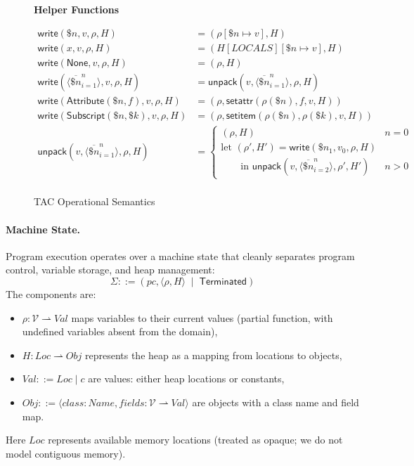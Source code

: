 \begin{figure*}[p]


\vspace{1ex}
\textbf{Helper Functions}

\[
\begin{aligned}
\mathsf{write}(\$n,v,\rho,H) &= (\rho[\$n \mapsto v],H) \\
\mathsf{write}(x,v,\rho,H) &= (H[LOCALS][\$n \mapsto v],H) \\
\mathsf{write}(\mathsf{None},v,\rho,H) &= (\rho,H) \\
\mathsf{write}(\langle\overline{\$n}_{i=1}^n\rangle,v,\rho,H)
    &= \mathsf{unpack}(v,\langle\overline{\$n}_{i=1}^n\rangle,\rho,H) \\
\mathsf{write}(\mathsf{Attribute}(\$n,f),v,\rho,H)
    &= (\rho,\mathsf{setattr}(\rho(\$n),f,v,H)) \\
\mathsf{write}(\mathsf{Subscript}(\$n,\$k),v,\rho,H)
    &= (\rho,\mathsf{setitem}(\rho(\$n),\rho(\$k),v,H)) \\[1ex]
\mathsf{unpack}(v,\langle\overline{\$n}_{i=1}^n\rangle,\rho,H) &=
\begin{cases}
(\rho,H) & n=0 \\
\text{let } (\rho',H')=\mathsf{write}(\$n_1,v_0,\rho,H) \\
\qquad \text{in } \mathsf{unpack}(v,\langle\overline{\$n}_{i=2}^n\rangle,\rho',H') & n>0
\end{cases} \\[2ex]
\end{aligned}
\]

\caption{TAC Operational Semantics}
\label{fig:tac-semantics}
\end{figure*}

\paragraph{Machine State.}
Program execution operates over a machine state that cleanly separates program control, variable storage, and heap management:
\[
\Sigma ::= ( pc, \langle \rho, H \rangle \;\mid\; \mathsf{Terminated} )
\]
The components are:
\begin{itemize}
\item $\rho : \mathcal{V} \rightharpoonup Val$ maps variables to their current values (partial function, with undefined variables absent from the domain),
\item $H : Loc \rightharpoonup Obj$ represents the heap as a mapping from locations to objects,
\item $Val ::= Loc \mid c$ are values: either heap locations or constants,
\item $Obj ::= \langle class:Name, fields: \mathcal{V} \rightharpoonup Val \rangle$ are objects with a class name and field map.
\end{itemize}
Here $Loc$ represents available memory locations (treated as opaque; we do not model contiguous memory).

